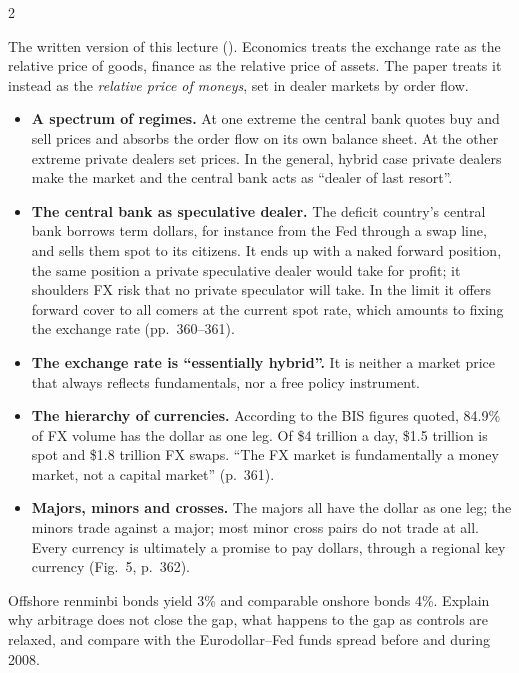 \begin{paracol}{2}
\begin{reading}
The written version of this lecture (). Economics treats the exchange rate as the relative price of goods, finance as the relative price of assets. The paper treats it instead as the \emph{relative price of moneys}, set in dealer markets by order flow.
\begin{itemize}
  \item \textbf{A spectrum of regimes.} At one extreme the central bank quotes buy and sell prices and absorbs the order flow on its own balance sheet. At the other extreme private dealers set prices. In the general, hybrid case private dealers make the market and the central bank acts as ``dealer of last resort''.
  \item \textbf{The central bank as speculative dealer.} The deficit country's central bank borrows term dollars, for instance from the Fed through a swap line, and sells them spot to its citizens. It ends up with a naked forward position, the same position a private speculative dealer would take for profit; it shoulders FX risk that no private speculator will take. In the limit it offers forward cover to all comers at the current spot rate, which amounts to fixing the exchange rate (pp.~360--361).
  \item \textbf{The exchange rate is ``essentially hybrid''.} It is neither a market price that always reflects fundamentals, nor a free policy instrument.
  \item \textbf{The hierarchy of currencies.} According to the BIS figures quoted, 84.9\% of FX volume has the dollar as one leg. Of \$4 trillion a day, \$1.5 trillion is spot and \$1.8 trillion FX swaps. ``The FX market is fundamentally a money market, not a capital market'' (p.~361).
  \item \textbf{Majors, minors and crosses.} The majors all have the dollar as one leg; the minors trade against a major; most minor cross pairs do not trade at all. Every currency is ultimately a promise to pay dollars, through a regional key currency (Fig.~5, p.~362).
\end{itemize}
\end{reading}

\flushside

\begin{exercise}
Offshore renminbi bonds yield 3\% and comparable onshore bonds 4\%. Explain why arbitrage does not close the gap, what happens to the gap as controls are relaxed,
and compare with the Eurodollar--Fed funds spread before and during 2008.
\end{exercise}

\end{paracol}
